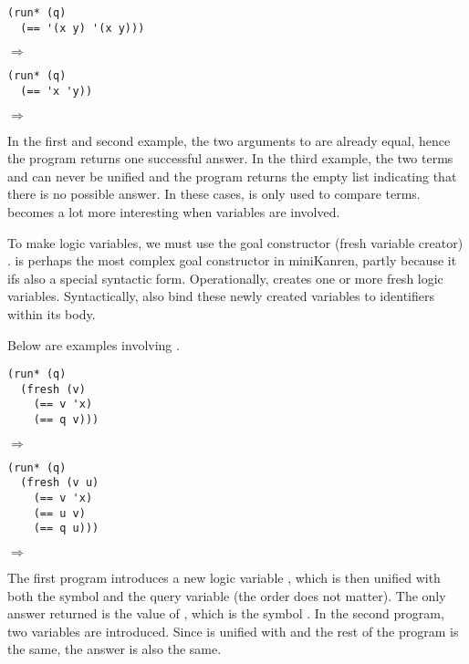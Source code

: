 \begin{lstlisting}
(run* (q)
  (== '(x y) '(x y)))
\end{lstlisting}
$\Rightarrow$ 

\begin{lstlisting}
(run* (q)
  (== 'x 'y))
\end{lstlisting}
$\Rightarrow$ \code{()}

In the first and second example, the two arguments to \code{==} are already equal, hence the program returns one successful answer. In the third example, the two terms  and  can never be unified and the program returns the empty list indicating that there is no possible answer. In these cases, \code{==} is only used to compare terms. \code{==} becomes a lot more interesting when variables are involved.

To make logic variables, we must use the goal constructor (fresh variable creator) .  is perhaps the most complex goal constructor in miniKanren, partly because it ifs also a special syntactic form. Operationally,  creates one or more fresh logic variables. Syntactically,  also bind these newly created variables to identifiers within its body.

Below are examples involving .

\begin{lstlisting}
(run* (q)
  (fresh (v)
    (== v 'x)
    (== q v)))
\end{lstlisting}
$\Rightarrow$ 

\begin{lstlisting}
(run* (q)
  (fresh (v u)
    (== v 'x)
    (== u v)
    (== q u)))
\end{lstlisting}
$\Rightarrow$ 

The first program introduces a new logic variable , which is then unified with both the symbol  and the query variable  (the order does not matter). The only answer returned is the value of , which is the symbol . In the second program, two variables are introduced. Since  is unified with  and the rest of the program is the same, the answer is also the same.

